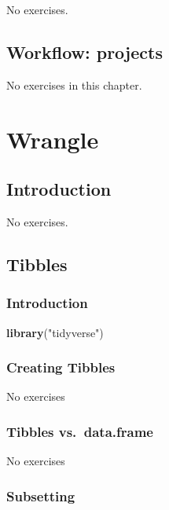 \documentclass[]{book}
\newenvironment{Shaded}{\begin{snugshade}}{\end{snugshade}}
\newcommand{\KeywordTok}[1]{\textcolor[rgb]{0.13,0.29,0.53}{\textbf{#1}}}
\newcommand{\NormalTok}[1]{#1}
\newcommand{\StringTok}[1]{\textcolor[rgb]{0.31,0.60,0.02}{#1}}
\theoremstyle{plain}
\theoremstyle{remark}
\begin{document}
No exercises.

\hypertarget{workflow-projects}{%
\chapter{Workflow: projects}\label{workflow-projects}}

No exercises in this chapter.

\hypertarget{part-wrangle}{%
\part{Wrangle}\label{part-wrangle}}

\hypertarget{introduction-4}{%
\chapter{Introduction}\label{introduction-4}}

No exercises.

\hypertarget{tibbles}{%
\chapter{Tibbles}\label{tibbles}}

\hypertarget{introduction-5}{%
\section{Introduction}\label{introduction-5}}

\begin{Shaded}
\begin{Highlighting}[]
\KeywordTok{library}\NormalTok{(}\StringTok{"tidyverse"}\NormalTok{)}
\end{Highlighting}
\end{Shaded}

\hypertarget{creating-tibbles}{%
\section{Creating Tibbles}\label{creating-tibbles}}

No exercises

\hypertarget{tibbles-vs.data.frame}{%
\section{Tibbles vs.~data.frame}\label{tibbles-vs.data.frame}}

No exercises

\hypertarget{subsetting}{%
\section{Subsetting}\label{subsetting}}
\end{document}
